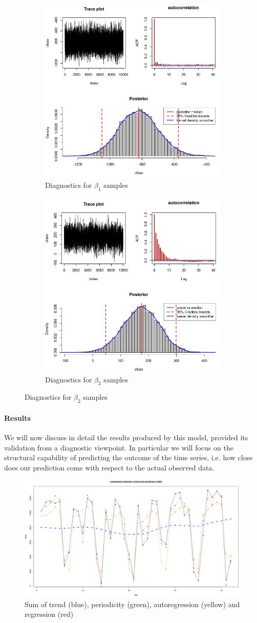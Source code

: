 \documentclass[11pt,twoside]{report}
\begin{document}
\begin{figure}[H]
	\begin{subfigure}[H]{0.50\linewidth}
		\centering
		\includegraphics[width=50 mm]{pictures/beta_1.png}
		\caption{Diagnostics for $ \beta_1 $ samples}
		\label{fig:beta_1}
	\end{subfigure}
	\hfill
	\begin{subfigure}[H]{0.50\linewidth}
		\centering
		\includegraphics[width=50 mm]{pictures/beta_2.png}
		\caption{Diagnostics for $ \beta_2 $ samples}
		\label{fig:beta_2}
	\end{subfigure}%
\end{figure}

\paragraph{Results}
We  will now discuss in detail the results produced by this model, provided its validation from a diagnostic viewpoint. In particular we will focus on the structural capability of predicting the outcome of the time series, i.e. how close does our prediction come with respect to the actual observed data.

\begin{figure}[H]
		\centering
		\includegraphics[width=150 mm]{pictures/m2_g1.png}
		\caption{Sum of trend (blue), periodicity (green), autoregression (yellow) and regression (red)}
		\label{fig:M2_p1}
	\end{figure}
\end{document}
